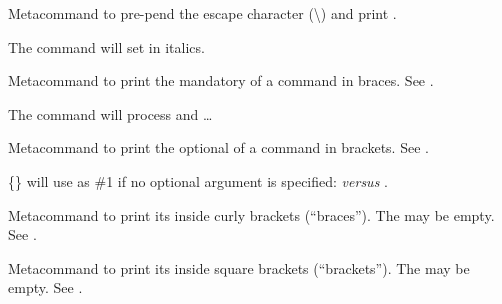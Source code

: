 \documentclass{article}
\newcommand\sqbrackets[1]{{\ttfamily [#1]}}
\begin{document}
\begin{docCommand}[
doc no index, %
doc name = cs,
doc parameter = \marg{control sequence name},
doc description=meta,
] {}%
{}%
Metacommand to pre-pend the escape character (\textbackslash) and print .
\begin{dispExample}
  The command  will set  
  in italics.
\end{dispExample}
\end{docCommand}


\begin{docCommand}[
doc no index, %
doc name = marg,
doc parameter = \marg{argument},
doc description=meta,
] {}%
{}%
Metacommand to print the mandatory  of a command in braces. See .
\begin{dispExample}
  The command  will process 
   and  \ldots
\end{dispExample}
\end{docCommand}

\begin{docCommand}[
doc no index, %
doc name = oarg,
doc parameter = \oarg{argument},
doc description=meta,
] {}%
{}%
Metacommand to print the optional  of a command in brackets. See .
\begin{dispExample}
  \{\}\sqbrackets{2}
   will use  as \#1 if no optional 
  argument  is specified: 
   \textit{versus} .
\end{dispExample}
\end{docCommand}


\begin{docCommand}[
doc no index, %
doc name = brackets,
doc parameter = \marg{argument},
doc description=meta,
] {}%
{}%
Metacommand to print its  inside curly brackets (``braces''). The  may be empty. See .
\begin{dispExample}
   \brackets{} \marg{}
\end{dispExample}
\end{docCommand}


\begin{docCommand}[
doc no index, %
doc name = sqbrackets,
doc parameter = \marg{argument},
doc description=meta,
] {}%
{}%
Metacommand to print its  inside square brackets (``brackets''). The  may be empty. See .
\begin{dispExample}
  \cs{foo}\sqbrackets{text} \cs{foo}\sqbrackets{} \oarg{}
\end{dispExample}
\end{docCommand}
\end{document}
